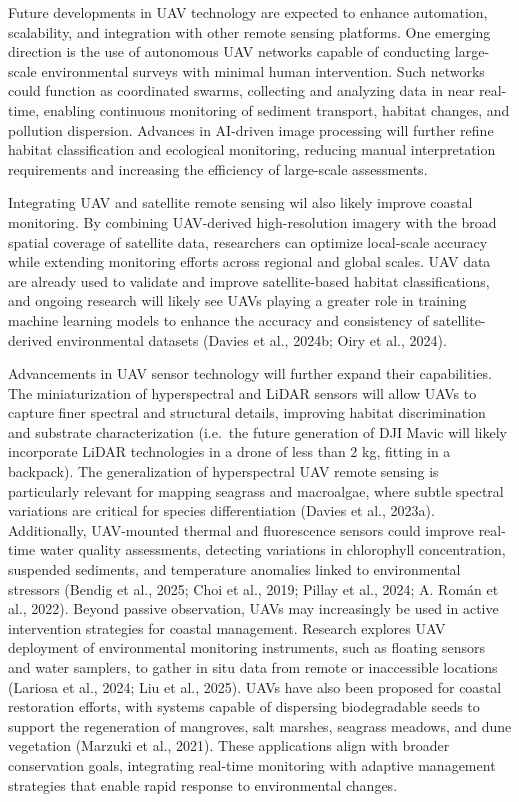\documentclass[
  letterpaper,
  11pt,
  english,
  singlespacing,
  headsepline]{MastersDoctoralThesis}
\begin{document}
\begin{spacing}{1.5}
\begin{figure}
\end{figure}%

Future developments in UAV technology are expected to enhance
automation, scalability, and integration with other remote sensing
platforms. One emerging direction is the use of autonomous UAV networks
capable of conducting large-scale environmental surveys with minimal
human intervention. Such networks could function as coordinated swarms,
collecting and analyzing data in near real-time, enabling continuous
monitoring of sediment transport, habitat changes, and pollution
dispersion. Advances in AI-driven image processing will further refine
habitat classification and ecological monitoring, reducing manual
interpretation requirements and increasing the efficiency of large-scale
assessments.

Integrating UAV and satellite remote sensing wil also likely improve
coastal monitoring. By combining UAV-derived high-resolution imagery
with the broad spatial coverage of satellite data, researchers can
optimize local-scale accuracy while extending monitoring efforts across
regional and global scales. UAV data are already used to validate and
improve satellite-based habitat classifications, and ongoing research
will likely see UAVs playing a greater role in training machine learning
models to enhance the accuracy and consistency of satellite-derived
environmental datasets (Davies et al., 2024b; Oiry et al., 2024).

Advancements in UAV sensor technology will further expand their
capabilities. The miniaturization of hyperspectral and LiDAR sensors
will allow UAVs to capture finer spectral and structural details,
improving habitat discrimination and substrate characterization
(i.e.~the future generation of DJI Mavic will likely incorporate LiDAR
technologies in a drone of less than 2 kg, fitting in a backpack). The
generalization of hyperspectral UAV remote sensing is particularly
relevant for mapping seagrass and macroalgae, where subtle spectral
variations are critical for species differentiation (Davies et al.,
2023a). Additionally, UAV-mounted thermal and fluorescence sensors could
improve real-time water quality assessments, detecting variations in
chlorophyll concentration, suspended sediments, and temperature
anomalies linked to environmental stressors (Bendig et al., 2025; Choi
et al., 2019; Pillay et al., 2024; A. Román et al., 2022). Beyond
passive observation, UAVs may increasingly be used in active
intervention strategies for coastal management. Research explores UAV
deployment of environmental monitoring instruments, such as floating
sensors and water samplers, to gather in situ data from remote or
inaccessible locations (Lariosa et al., 2024; Liu et al., 2025). UAVs
have also been proposed for coastal restoration efforts, with systems
capable of dispersing biodegradable seeds to support the regeneration of
mangroves, salt marshes, seagrass meadows, and dune vegetation (Marzuki
et al., 2021). These applications align with broader conservation goals,
integrating real-time monitoring with adaptive management strategies
that enable rapid response to environmental changes.


\end{spacing}
\end{document}
